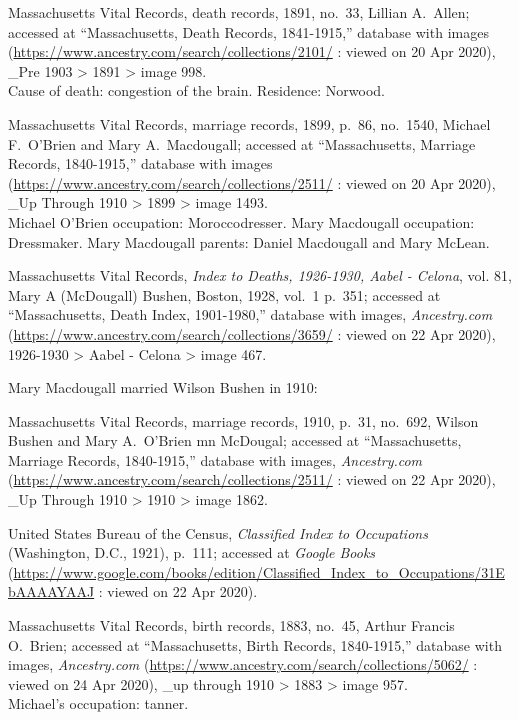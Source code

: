 \begin{thebibliography}{999}
	Massachusetts Vital Records, death records, 1891, no.\ 33, Lillian A.\ Allen; accessed at ``Massachusetts, Death Records, 1841-1915,'' database with images (\url{https://www.ancestry.com/search/collections/2101/} : viewed on 20 Apr 2020), \_Pre 1903 > 1891 > image 998.\\
	Cause of death: congestion of the brain. Residence: Norwood.
	
	Massachusetts Vital Records, marriage records, 1899, p.\ 86, no.\ 1540, Michael F.\ O'Brien and Mary A.\ Macdougall; accessed at ``Massachusetts, Marriage Records, 1840-1915,'' database with images (\url{https://www.ancestry.com/search/collections/2511/} : viewed on 20 Apr 2020), \_Up Through 1910 > 1899 > image 1493.\\
	Michael O'Brien occupation: Moroccodresser. Mary Macdougall occupation: Dressmaker. Mary Macdougall parents: Daniel Macdougall and Mary McLean.
	
	Massachusetts Vital Records, \textit{Index to Deaths, 1926-1930, Aabel - Celona}, vol. 81, Mary A (McDougall) Bushen, Boston, 1928, vol.\ 1 p.\ 351; accessed at ``Massachusetts, Death Index, 1901-1980,'' database with images, \textit{Ancestry.com} (\url{https://www.ancestry.com/search/collections/3659/} : viewed on 22 Apr 2020), 1926-1930 > Aabel - Celona > image 467.
	
	Mary Macdougall married Wilson Bushen in 1910:
	
	Massachusetts Vital Records, marriage records, 1910, p.\ 31, no.\ 692, Wilson Bushen and Mary A.\ O'Brien mn McDougal; accessed at ``Massachusetts, Marriage Records, 1840-1915,'' database with images, \textit{Ancestry.com} (\url{https://www.ancestry.com/search/collections/2511/} : viewed on 22 Apr 2020), \_Up Through 1910 > 1910 > image 1862.
	
	United States Bureau of the Census, \textit{Classified Index to Occupations} (Washington, D.C., 1921), p.\ 111; accessed at \textit{Google Books} (\url{https://www.google.com/books/edition/Classified_Index_to_Occupations/31EbAAAAYAAJ} : viewed on 22 Apr 2020).
	
	Massachusetts Vital Records, birth records, 1883, no.\ 45, Arthur Francis O.\ Brien; accessed at ``Massachusetts, Birth Records, 1840-1915,'' database with images, \textit{Ancestry.com} (\url{https://www.ancestry.com/search/collections/5062/} : viewed on 24 Apr 2020), \_up through 1910 > 1883 > image 957.\\
	Michael's occupation: tanner.
	

\end{thebibliography}
